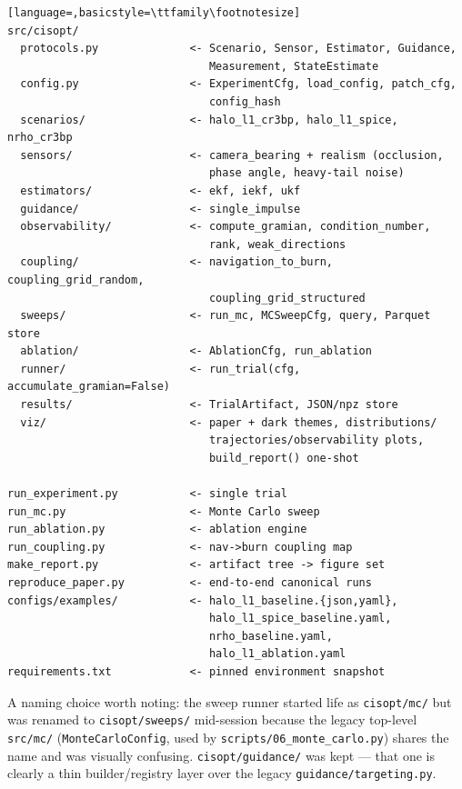\documentclass[11pt]{article}
\begin{document}
\begin{lstlisting}[language=,basicstyle=\ttfamily\footnotesize]
src/cisopt/
  protocols.py              <- Scenario, Sensor, Estimator, Guidance,
                               Measurement, StateEstimate
  config.py                 <- ExperimentCfg, load_config, patch_cfg,
                               config_hash
  scenarios/                <- halo_l1_cr3bp, halo_l1_spice, nrho_cr3bp
  sensors/                  <- camera_bearing + realism (occlusion,
                               phase angle, heavy-tail noise)
  estimators/               <- ekf, iekf, ukf
  guidance/                 <- single_impulse
  observability/            <- compute_gramian, condition_number,
                               rank, weak_directions
  coupling/                 <- navigation_to_burn, coupling_grid_random,
                               coupling_grid_structured
  sweeps/                   <- run_mc, MCSweepCfg, query, Parquet store
  ablation/                 <- AblationCfg, run_ablation
  runner/                   <- run_trial(cfg, accumulate_gramian=False)
  results/                  <- TrialArtifact, JSON/npz store
  viz/                      <- paper + dark themes, distributions/
                               trajectories/observability plots,
                               build_report() one-shot

run_experiment.py           <- single trial
run_mc.py                   <- Monte Carlo sweep
run_ablation.py             <- ablation engine
run_coupling.py             <- nav->burn coupling map
make_report.py              <- artifact tree -> figure set
reproduce_paper.py          <- end-to-end canonical runs
configs/examples/           <- halo_l1_baseline.{json,yaml},
                               halo_l1_spice_baseline.yaml,
                               nrho_baseline.yaml,
                               halo_l1_ablation.yaml
requirements.txt            <- pinned environment snapshot
\end{lstlisting}

\noindent
A naming choice worth noting: the sweep runner started life as
\texttt{cisopt/mc/} but was renamed to \texttt{cisopt/sweeps/} mid-session
because the legacy top-level \texttt{src/mc/} (\texttt{MonteCarloConfig},
used by \texttt{scripts/06\_monte\_carlo.py}) shares the name and was
visually confusing. \texttt{cisopt/guidance/} was kept --- that one is
clearly a thin builder/registry layer over the legacy
\texttt{guidance/targeting.py}.

\end{document}
